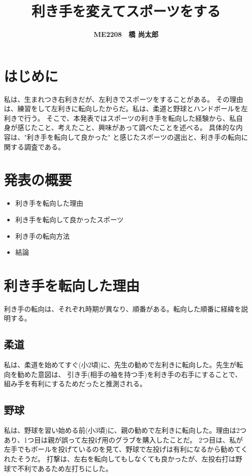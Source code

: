 \documentclass[a4paper,10pt,twocolumn]{jsarticle}
\begin{document}
\title{\textbf{\textsf{利き手を変えてスポーツをする}}}
\author{\textbf{ME2208　\textsf{橋 尚太郎}}}
\date{}
\maketitle
\section{はじめに}
私は、生まれつき右利きだが、左利きでスポーツをすることがある。
その理由は、練習をして左利きに転向したからだ。私は、柔道と野球とハンドボールを左利きで行う。
そこで、本発表ではスポーツの利き手を転向した経験から、私自身が感じたこと、考えたこと、興味があって調べたことを述べる。
具体的な内容は、"利き手を転向して良かった" と感じたスポーツの選出と、利き手の転向に関する調査である。
\section{発表の概要}
\begin{itemize}
    \item 利き手を転向した理由
    \item 利き手を転向して良かったスポーツ
    \item 利き手の転向方法
    \item 結論
\end{itemize}
\section{利き手を転向した理由}
利き手の転向は、それぞれ時期が異なり、順番がある。転向した順番に経緯を説明する。
\vspace{3mm}
\subsection{柔道}
私は、柔道を始めてすぐ(小2頃)に、先生の勧めで左利きに転向した。先生が転向を勧めた意図は、
引き手(相手の袖を持つ手)を利き手の右手にすることで、組み手を有利にするためだったと推測される。
\vspace{3mm}
\subsection{野球}
私は、野球を習い始める前(小3頃)に、親の勧めで左利きに転向した。理由は2つあり、1つ目は親が誤って左投げ用のグラブを購入したことだ。
2つ目は、私が左手でもボールを投げているのを見て、野球で左投げは有利になるから勧めてくれたそうだ。
打撃は、左右を転向してもしなくても良かったが、左投右打は野球で不利であるため左打ちにした。
\vspace{3mm}
\end{document}
